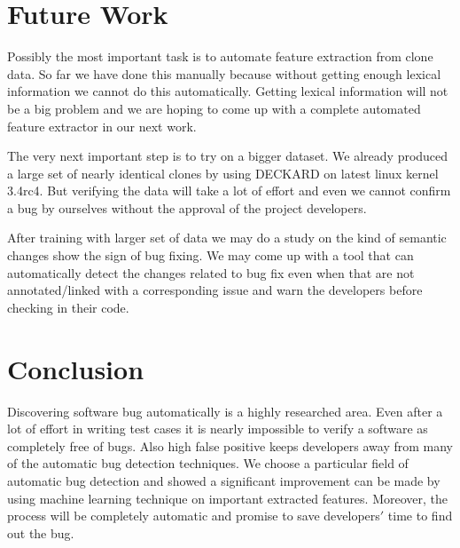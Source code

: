\documentclass[nocopyrightspace]{sigplanconf}
\begin{document}
\section{Future Work}
Possibly the most important task is to automate feature extraction from clone data. So far we have done this manually because without getting enough lexical information we cannot do this automatically. Getting lexical information will not be a big problem and we are hoping to come up with a complete automated feature extractor in our next work.

\vspace{10pt}
\noindent 
The very next important step is to try on a bigger dataset. We already produced a large set of nearly identical clones by using DECKARD on latest linux kernel 3.4rc4. But verifying the data will take a lot of effort and even we cannot confirm a bug by ourselves without the approval of the project developers.

\vspace{10pt}
\noindent
After training with larger set of data we may do a study on the kind of semantic changes show the sign of bug fixing. We may come up with a tool that can automatically detect the changes related to bug fix even when that are not annotated/linked with a corresponding issue and warn the developers before checking in their code.

\section{Conclusion}
Discovering software bug automatically is a highly researched area. Even after a lot of effort in writing test cases it is nearly impossible to verify a software as completely free of bugs. Also high false positive keeps developers away from many of the automatic bug detection techniques. We choose a particular field of automatic bug detection and showed a significant improvement can be made by using machine learning technique on important extracted features. Moreover, the process will be completely automatic and promise to save developers$'$ time to find out the bug.



\end{document}
